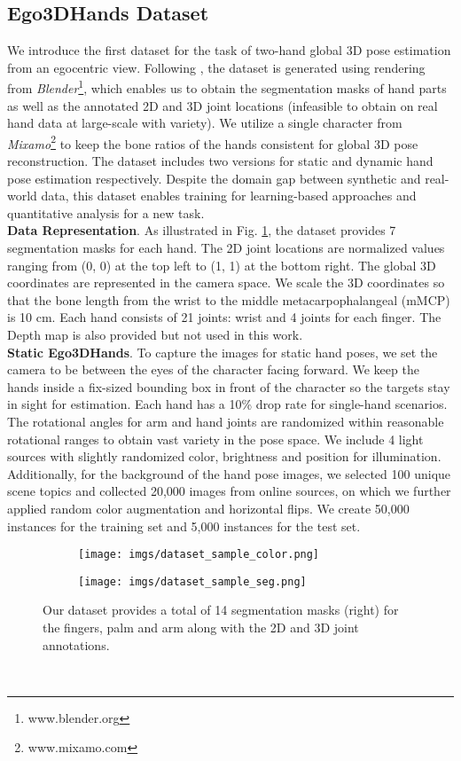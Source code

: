 \documentclass[10pt,twocolumn,letterpaper]{article}
\begin{document}
\subsection{Ego3DHands Dataset}
\indent We introduce the first dataset for the task of two-hand global 3D pose estimation from an egocentric view. Following \cite{Zimmermann}, the dataset is generated using rendering from \textit{Blender}\footnote{www.blender.org}, which enables us to obtain the segmentation masks of hand parts as well as the annotated 2D and 3D joint locations (infeasible to obtain on real hand data at large-scale with variety). We utilize a single character from \textit{Mixamo}\footnote{www.mixamo.com} to keep the bone ratios of the hands consistent for global 3D pose reconstruction. The dataset includes two versions for static and dynamic hand pose estimation respectively. Despite the domain gap between synthetic and real-world data, this dataset enables training for learning-based approaches and quantitative analysis for a new task. \\
\noindent\textbf{Data Representation}. As illustrated in Fig. \ref{fig:dataset_img}, the dataset provides 7 segmentation masks for each hand. The 2D joint locations are normalized values ranging from (0, 0) at the top left to (1, 1) at the bottom right. The global 3D coordinates are represented in the camera space. We scale the 3D coordinates so that the bone length from the wrist to the middle metacarpophalangeal (mMCP) is 10 cm. Each hand consists of 21 joints: wrist and 4 joints for each finger. The Depth map is also provided but not used in this work.\\
\noindent\textbf{Static Ego3DHands}. To capture the images for static hand poses, we set the camera to be between the eyes of the character facing forward. We keep the hands inside a fix-sized bounding box in front of the character so the targets stay in sight for estimation. Each hand has a 10\% drop rate for single-hand scenarios. The rotational angles for arm and hand joints are randomized within reasonable rotational ranges to obtain vast variety in the pose space. We include 4 light sources with slightly randomized color, brightness and position for illumination. Additionally, for the background of the hand pose images, we selected 100 unique scene topics and collected 20,000 images from online sources, on which we further applied random color augmentation and horizontal flips. We create 50,000 instances for the training set and 5,000 instances for the test set.
\begin{figure}[t]
  \centering
  \begin{subfigure}[b]{0.48\linewidth}
  \texttt{[image: imgs/dataset\_sample\_color.png]}
  \end{subfigure}
  \begin{subfigure}[b]{0.48\linewidth}
  \texttt{[image: imgs/dataset\_sample\_seg.png]}
  \end{subfigure}
  \caption{Our dataset provides a total of 14 segmentation masks (right) for the fingers, palm and arm along with the 2D and 3D joint annotations.}
  \label{fig:dataset_img}
\end{figure}\\
\end{document}

